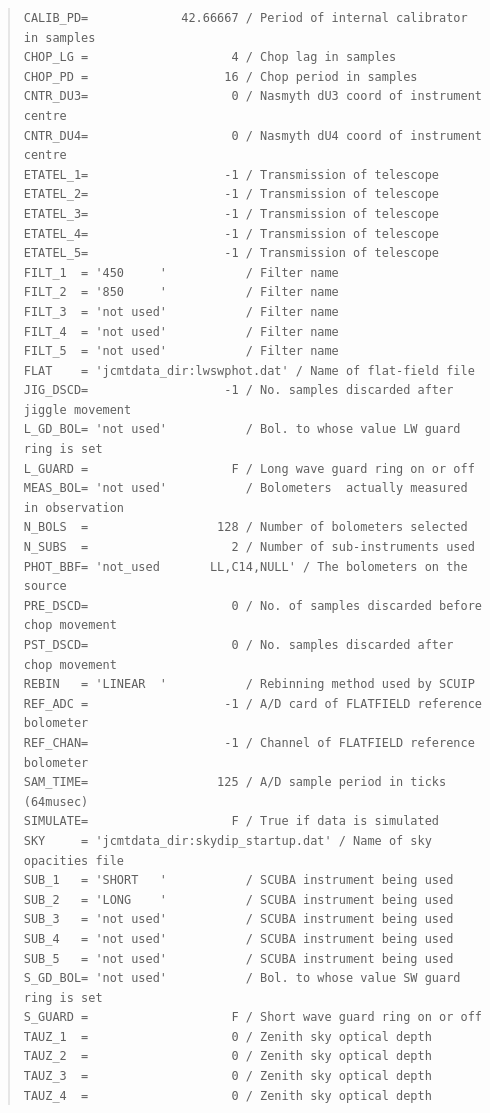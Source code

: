 \documentclass[twoside,11pt]{article}
\newenvironment{myquote}{\begin{quote}\begin{small}}{\end{small}\end{quote}}
\renewcommand{\_}{\texttt{\symbol{95}}}
\begin{document}
\begin{myquote}
\begin{verbatim}
CALIB_PD=             42.66667 / Period of internal calibrator in samples
CHOP_LG =                    4 / Chop lag in samples
CHOP_PD =                   16 / Chop period in samples
CNTR_DU3=                    0 / Nasmyth dU3 coord of instrument centre
CNTR_DU4=                    0 / Nasmyth dU4 coord of instrument centre
ETATEL_1=                   -1 / Transmission of telescope
ETATEL_2=                   -1 / Transmission of telescope
ETATEL_3=                   -1 / Transmission of telescope
ETATEL_4=                   -1 / Transmission of telescope
ETATEL_5=                   -1 / Transmission of telescope
FILT_1  = '450     '           / Filter name
FILT_2  = '850     '           / Filter name
FILT_3  = 'not used'           / Filter name
FILT_4  = 'not used'           / Filter name
FILT_5  = 'not used'           / Filter name
FLAT    = 'jcmtdata_dir:lwswphot.dat' / Name of flat-field file
JIG_DSCD=                   -1 / No. samples discarded after jiggle movement
L_GD_BOL= 'not used'           / Bol. to whose value LW guard ring is set
L_GUARD =                    F / Long wave guard ring on or off
MEAS_BOL= 'not used'           / Bolometers  actually measured in observation
N_BOLS  =                  128 / Number of bolometers selected
N_SUBS  =                    2 / Number of sub-instruments used
PHOT_BBF= 'not_used       LL,C14,NULL' / The bolometers on the source
PRE_DSCD=                    0 / No. of samples discarded before chop movement
PST_DSCD=                    0 / No. samples discarded after chop movement
REBIN   = 'LINEAR  '           / Rebinning method used by SCUIP
REF_ADC =                   -1 / A/D card of FLATFIELD reference bolometer
REF_CHAN=                   -1 / Channel of FLATFIELD reference bolometer
SAM_TIME=                  125 / A/D sample period in ticks (64musec)
SIMULATE=                    F / True if data is simulated
SKY     = 'jcmtdata_dir:skydip_startup.dat' / Name of sky opacities file
SUB_1   = 'SHORT   '           / SCUBA instrument being used
SUB_2   = 'LONG    '           / SCUBA instrument being used
SUB_3   = 'not used'           / SCUBA instrument being used
SUB_4   = 'not used'           / SCUBA instrument being used
SUB_5   = 'not used'           / SCUBA instrument being used
S_GD_BOL= 'not used'           / Bol. to whose value SW guard ring is set
S_GUARD =                    F / Short wave guard ring on or off
TAUZ_1  =                    0 / Zenith sky optical depth
TAUZ_2  =                    0 / Zenith sky optical depth
TAUZ_3  =                    0 / Zenith sky optical depth
TAUZ_4  =                    0 / Zenith sky optical depth

\end{verbatim}
\end{myquote}
\end{document}
